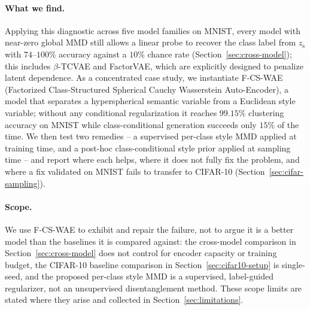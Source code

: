 \documentclass[10pt,letterpaper]{article}
\newcommand{\ours}{F-CS-WAE}
\newcommand{\zs}{z_{\mathrm{s}}}
\begin{document}
\paragraph{What we find.}
Applying this diagnostic across five model families on MNIST, every model
with near-zero global MMD still allows a linear probe to recover the class
label from $\zs$ with $74$--$100\%$ accuracy against a $10\%$ chance rate
(Section~\ref{sec:cross-model}); this includes $\beta$-TCVAE and FactorVAE,
which are explicitly designed to penalize latent dependence. As a
concentrated case study, we instantiate \ours{} (Factorized
Class-Structured Spherical Cauchy Wasserstein Auto-Encoder), a model that
separates a hyperspherical semantic variable from a Euclidean style
variable; without any conditional regularization it reaches $99.15\%$
clustering accuracy on MNIST while class-conditional generation succeeds
only $15\%$ of the time. We then test two remedies -- a supervised
per-class style MMD applied at training time, and a post-hoc
class-conditional style prior applied at sampling time -- and report where
each helps, where it does not fully fix the problem, and where a fix
validated on MNIST fails to transfer to CIFAR-10
(Section~\ref{sec:cifar-sampling}).

\paragraph{Scope.}
We use \ours{} to exhibit and repair the failure, not to argue it is a
better model than the baselines it is compared against: the cross-model
comparison in Section~\ref{sec:cross-model} does not control for encoder
capacity or training budget, the CIFAR-10 baseline comparison in
Section~\ref{sec:cifar10-setup} is single-seed, and the proposed per-class
style MMD is a supervised, label-guided regularizer, not an unsupervised
disentanglement method. These scope limits are stated where they arise and
collected in Section~\ref{sec:limitations}.
\end{document}

